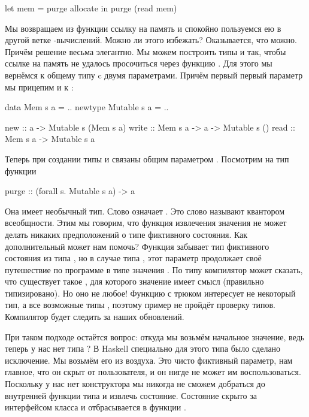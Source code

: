 \begin{code}
let mem = purge allocate
in  purge (read mem)
\end{code}

Мы возвращаем из функции  ссылку на память
и спокойно пользуемся ею в другой ветке -вычислений.
Можно ли этого избежать? Оказывается, что можно. 
Причём решение весьма элегантно. Мы можем построить типы
 и  так, чтобы ссылке на память не удалось
просочиться через функцию . Для этого мы вернёмся
к общему типу  c двумя параметрами. Причём
первый первый параметр мы прицепим и к :

\begin{code}
data    Mem     s a = ..
newtype Mutable s a = ..

new     :: a -> Mutable s (Mem s a)
write   :: Mem s a -> a -> Mutable s ()
read    :: Mem s a -> Mutable s a
\end{code}

Теперь при создании типы  и  связаны общим
параметром . Посмотрим на тип функции 

\begin{code}
purge :: (forall s. Mutable s a) -> a
\end{code}

Она имеет необычный тип. Слово  
означает . Это слово называют квантором
всеобщности. Этим мы говорим, что функция извлечения
значения не может делать никаких предположений о типе 
фиктивного состояния. 
Как дополнительный  может нам помочь? 
Функция  забывает тип фиктивного состояния 
из типа , но в случае типа , этот параметр
продолжает своё путешествие по программе в типе значения 
.
По типу  компилятор может сказать, что существует
такое , для которого значение  имеет смысл
(правильно типизировано). Но оно не любое! Функцию 
с трюком интересует не некоторый тип, а все возможные типы ,
поэтому пример не пройдёт проверку типов. Компилятор будет следить
за  наших обновлений.

При таком подходе остаётся вопрос: откуда мы возьмём начальное
значение, ведь теперь у нас нет типа ? 
В Haskell специально для этого типа было сделано исключение.
Мы возьмём его из воздуха. Это чисто фиктивный параметр, нам главное,
что он скрыт от пользователя, и он нигде не может им воспользоваться.
Поскольку у нас нет конструктора  мы никогда не сможем
добраться до внутренней функции типа  и извлечь состояние.
Состояние скрыто за интерфейсом класса  и 
отбрасывается в функции .


